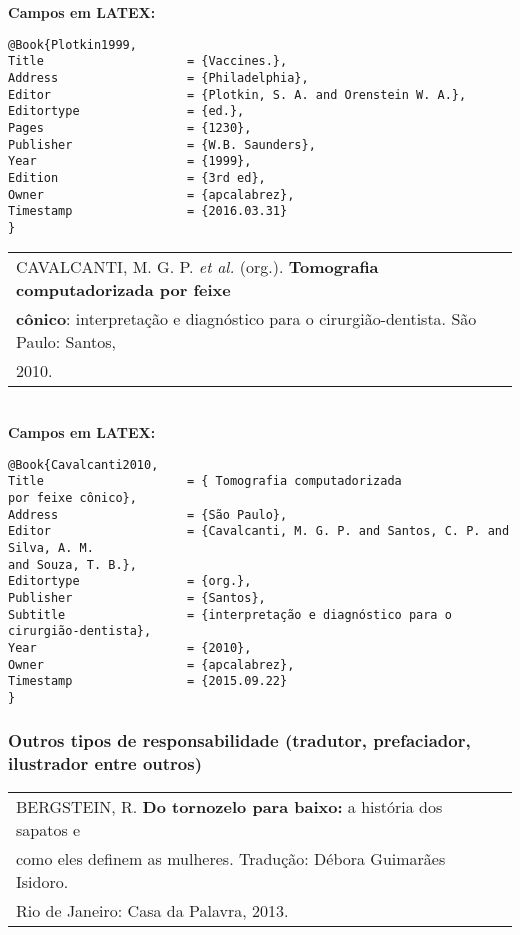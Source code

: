 \textbf{Campos em LATEX:}

\begin{verbatim}
@Book{Plotkin1999,
Title                    = {Vaccines.},
Address                  = {Philadelphia},
Editor                   = {Plotkin, S. A. and Orenstein W. A.},
Editortype               = {ed.},
Pages                    = {1230},
Publisher                = {W.B. Saunders},
Year                     = {1999},
Edition                  = {3rd ed},
Owner                    = {apcalabrez},
Timestamp                = {2016.03.31}
}
\end{verbatim}

\begin{tabular}{|l|c|} \hline
	CAVALCANTI, M. G. P. \textit{et al.} (org.). \textbf{Tomografia computadorizada por feixe} \\ \textbf{cônico}: interpretação e diagnóstico para o cirurgião-dentista. São Paulo: Santos, \\ 2010.\\\hline
\end{tabular}\\

\textbf{Campos em LATEX:}

\begin{verbatim}
@Book{Cavalcanti2010,
Title                    = { Tomografia computadorizada 
por feixe cônico},
Address                  = {São Paulo},
Editor                   = {Cavalcanti, M. G. P. and Santos, C. P. and 
Silva, A. M.
and Souza, T. B.},
Editortype               = {org.},
Publisher                = {Santos},
Subtitle                 = {interpretação e diagnóstico para o 
cirurgião-dentista},
Year                     = {2010},
Owner                    = {apcalabrez},
Timestamp                = {2015.09.22}
}
\end{verbatim}

\subsubsection{Outros tipos de responsabilidade (tradutor, prefaciador, ilustrador entre outros)} 


\begin{tabular}{|l|c|} \hline
	BERGSTEIN, R. \textbf{Do tornozelo para baixo:}  a história dos
	sapatos e \\ como eles definem as mulheres. Tradução: D\'ebora Guimarães Isidoro.\\ Rio de
	Janeiro: Casa da Palavra, 2013. \\\hline
\end{tabular}\\

